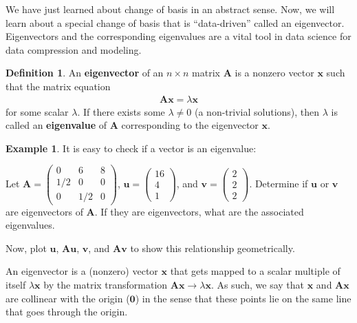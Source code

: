 \documentclass[
]{book}
\theoremstyle{definition}
\newtheorem{definition}{Definition}[chapter]
\theoremstyle{definition}
\newtheorem{example}{Example}[chapter]
\theoremstyle{definition}
\theoremstyle{definition}
\theoremstyle{remark}
\begin{document}
We have just learned about change of basis in an abstract sense. Now, we will learn about a special change of basis that is ``data-driven'' called an eigenvector. Eigenvectors and the corresponding eigenvalues are a vital tool in data science for data compression and modeling.

\begin{definition}
An \textbf{eigenvector} of an \(n \times n\) matrix \(\mathbf{A}\) is a nonzero vector \(\mathbf{x}\) such that the matrix equation
\[
\begin{aligned}
\mathbf{A} \mathbf{x} = \lambda \mathbf{x}
\end{aligned}
\]
for some scalar \(\lambda\). If there exists some \(\lambda \neq 0\) (a non-trivial solutions), then \(\lambda\) is called an \textbf{eigenvalue} of \(\mathbf{A}\) corresponding to the eigenvector \(\mathbf{x}\).
\end{definition}

\begin{example}
It is easy to check if a vector is an eigenvalue:

Let \(\mathbf{A} = \begin{pmatrix} 0 & 6 & 8 \\ 1/2 & 0 & 0 \\ 0 & 1/2 & 0 \end{pmatrix}\), \(\mathbf{u} = \begin{pmatrix} 16 \\ 4 \\ 1 \end{pmatrix}\), and \(\mathbf{v} = \begin{pmatrix} 2 \\ 2 \\ 2 \end{pmatrix}\). Determine if \(\mathbf{u}\) or \(\mathbf{v}\) are eigenvectors of \(\mathbf{A}\). If they are eigenvectors, what are the associated eigenvalues.

Now, plot \(\mathbf{u}\), \(\mathbf{A} \mathbf{u}\), \(\mathbf{v}\), and \(\mathbf{A} \mathbf{v}\) to show this relationship geometrically.
\end{example}

An eigenvector is a (nonzero) vector \(\mathbf{x}\) that gets mapped to a scalar multiple of itself \(\lambda \mathbf{x}\) by the matrix transformation \(\mathbf{A}\mathbf{x} \rightarrow \lambda \mathbf{x}\). As such, we say that \(\mathbf{x}\) and \(\mathbf{A} \mathbf{x}\) are collinear with the origin (\(\mathbf{0}\)) in the sense that these points lie on the same line that goes through the origin.
\end{document}
